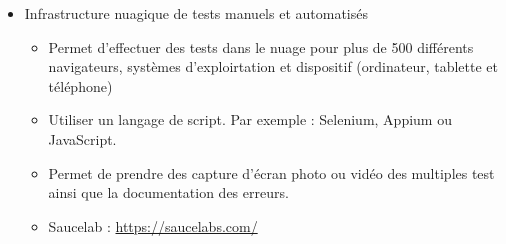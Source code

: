 \begin{frame}[allowframebreaks]
\begin {itemize}
				\begin {itemize}
				\item Activité qui consiste à attribuer à chaque bogue relevé dans un programme une adresse permettant d'accéder à un fichier décrivant les caractéristiques de ce bogue, de manière à évaluer leur importance et à contrôler les dommages qu'ils pourraient causer.  \\Le suivi de bogues comprend :
					\begin {itemize}
					\item l'enregistrement des bogues, 
					\item leur examen, 
					\item l'enregistrement des correctifs requis,
					\item la décision de considérer ou non la pertinence d'une correction, selon l'importance du bogue et le budget disponible.  
					\end{itemize}
					\item Buggenie : \url{http://www.thebuggenie.com/}
				\end{itemize}
			\framebreak
			\item Infrastructure nuagique de tests manuels et automatisés
				\begin {itemize}
					\item Permet d'effectuer des tests dans le nuage pour plus de 500 différents navigateurs, systèmes d'exploirtation et dispositif (ordinateur, tablette et téléphone)
					\item Utiliser un langage de script. Par exemple : Selenium, Appium ou JavaScript.
					\item Permet de prendre des capture d'écran photo ou vidéo des multiples test ainsi que la documentation des erreurs.
					\item Saucelab : \url{https://saucelabs.com/} 
					\end{itemize}
			
			\end{itemize}
		\end{frame}    
	
		
		
		
		
		                
						
\nocite{stc2014a}	
\nocite{grant2002a}
\nocite{grant2002b}
\nocite{Perfetti2003a}	
\nocite{Usability2013a}
\nocite{fast2002a}	
\nocite{light2001a}
\nocite{spool2001a}
\nocite{woolrych2001a}
\nocite{fleming1998a}
\nocite{kuniavsky1998a}
\nocite{gordon2000a}	
\nocite{kirby2000a}	
\nocite{nielsen2000a}
\nocite{rubin2008handbook}		
\nocite{dumas1999practical}	
				

